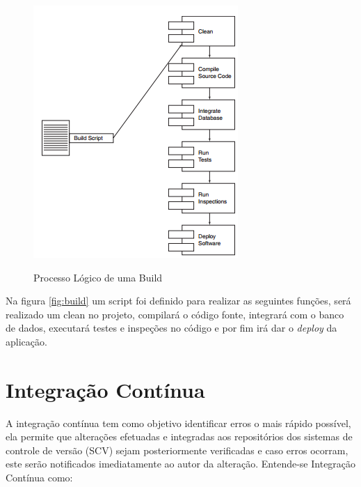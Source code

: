\begin{figure}[h]
\centering
\caption[Processo Lógico de uma Build]{Processo Lógico de uma Build}
\includegraphics[width=0.7\linewidth]{./images/build}
\label{fig:build}
\end{figure}
Na figura \autoref{fig:build} um script foi definido para realizar as seguintes funções, será realizado um clean no projeto, compilará o código fonte, integrará com o banco de dados, executará testes e inspeções no código e por fim irá dar o \textit{deploy} da aplicação.



\section{Integração Contínua}\label{integracaocont}
\begin{OnehalfSpace}
A integração contínua tem como objetivo identificar erros o mais rápido possível, ela permite que alterações efetuadas e integradas aos repositórios dos sistemas de controle de versão (SCV) sejam posteriormente verificadas e caso erros ocorram, este serão notificados imediatamente ao autor da alteração.
Entende-se Integração Contínua como:
\end{OnehalfSpace}

